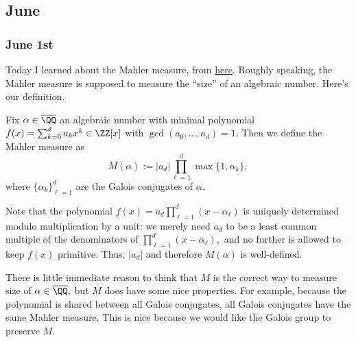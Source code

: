 \subsection{June}







\subsubsection{June 1st}
Today I learned about the Mahler measure, from \href{https://web.archive.org/web/20210112151948/https://www.uni-due.de/~adg350u/Skripte/DioApp.pdf}{here}. Roughly speaking, the Mahler measure is supposed to measure the ``size'' of an algebraic number. Here's our definition.
\begin{definition}
    Fix $\alpha\in\overline\QQ$ an algebraic number with minimal polynomial $f(x)=\sum_{k=0}^da_kx^k\in\ZZ[x]$ with $\gcd(a_0,\ldots,a_d)=1.$ Then we define the Mahler measure as
    \[M(\alpha):=|a_d|\prod_{\ell=1}^d\max\{1,\alpha_k\},\]
    where $\{\alpha_k\}_{\ell=1}^d$ are the Galois conjugates of $\alpha.$
\end{definition}
Note that the polynomial $f(x)=a_d\prod_{\ell=1}^d(x-\alpha_\ell)$ is uniquely determined modulo multiplication by a unit: we merely need $a_d$ to be a least common multiple of the denominators of $\prod_{\ell=1}^d(x-\alpha_\ell),$ and no further is allowed to keep $f(x)$ primitive. Thus, $|a_d|$ and therefore $M(\alpha)$ is well-defined.

There is little immediate reason to think that $M$ is the correct way to measure size of $\alpha\in\overline\QQ,$ but $M$ does have some nice properties. For example, because the polynomial is shared between all Galois conjugates, all Galois conjugates have the same Mahler measure. This is nice because we would like the Galois group to preserve $M.$

